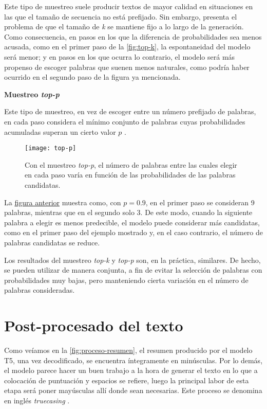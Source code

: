 Este tipo de muestreo suele producir textos de mayor calidad en situaciones en las que el tamaño de secuencia no está prefijado. Sin embargo, presenta el problema de que el tamaño de \emph{k} se mantiene fijo a lo largo de la generación. Como consecuencia, en pasos en los que la diferencia de probabilidades sea menos acusada, como en el primer paso de la \autoref{fig:top-k}, la espontaneidad del modelo será menor; y en pasos en los que ocurra lo contrario, el modelo será más propenso de escoger palabras que suenen menos naturales, como podría haber ocurrido en el segundo paso de la figura ya mencionada.


\bigskip
\noindent
\textbf{Muestreo \emph{top-p}}

Este tipo de muestreo, en vez de escoger entre un número prefijado de palabras, en cada paso considera el mínimo conjunto de palabras cuyas probabilidades acumuladas superan un cierto valor $p$ \cite{holtzman20}.

\begin{figure}[!h]
	\centering
	\texttt{[image: top-p]}
	\caption[Ejemplo de muestreo \emph{top-p}.]{Con el muestreo \emph{top-p}, el número de palabras entre las cuales elegir en cada paso varía en función de las probabilidades de las palabras candidatas.}
	\label{fig:top-p}
\end{figure}

La \hyperref[top-p]{figura anterior} muestra como, con $p=0.9$, en el primer paso se consideran 9 palabras, mientras que en el segundo solo 3. De este modo, cuando la siguiente palabra a elegir es menos predecible, el modelo puede considerar más candidatas, como en el primer paso del ejemplo mostrado y, en el caso contrario, el número de palabras candidatas se reduce.

Los resultados del muestreo \emph{top-k} y \emph{top-p} son, en la práctica, similares. De hecho, se pueden utilizar de manera conjunta, a fin de evitar la selección de palabras con probabilidades muy bajas, pero manteniendo cierta variación en el número de palabras consideradas.



\section{Post-procesado del texto} \label{sec:postprocesado}

Como veíamos en la \autoref{fig:proceso-resumen}, el resumen producido por el modelo T5, una vez decodificado, se encuentra íntegramente en minúsculas. Por lo demás, el modelo parece hacer un buen trabajo a la hora de generar el texto en lo que a colocación de puntuación y espacios se refiere, luego la principal labor de esta etapa será poner mayúsculas allí donde sean necesarias. Este proceso se denomina en inglés \emph{truecasing} \cite{lita03}.

